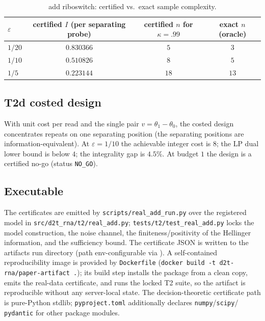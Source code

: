 \documentclass[11pt]{article}
\begin{document}
\begin{table}[ht]
\centering
\caption{add riboswitch: certified vs.\ exact sample complexity.}
\label{tab:supp-real}
\begin{tabular}{@{}lccc@{}}
\toprule
$\varepsilon$ & certified $I$ (per separating probe) & certified $n$ for $\kappa=.99$ & exact $n$ (oracle) \\
\midrule
$1/20$ & $0.830366$ & $5$ & $3$ \\
$1/10$ & $0.510826$ & $8$ & $5$ \\
$1/5$  & $0.223144$ & $18$ & $13$ \\
\bottomrule
\end{tabular}
\end{table}

\subsection{T2d costed design}
With unit cost per read and the single pair $v=\theta_1-\theta_0$, the costed design concentrates
repeats on one separating position (the separating positions are information-equivalent). At
$\varepsilon=1/10$ the achievable integer cost is $8$; the LP dual lower bound is below $4$; the
integrality gap is $4.5\%$. At budget $1$ the design is a certified no-go (status \texttt{NO\_GO}).

\subsection{Executable}
The certificates are emitted by \texttt{scripts/real\_add\_run.py} over the registered model in
\texttt{src/d2t\_rna/t2/real\_add.py}; \texttt{tests/t2/test\_real\_add.py} locks the model
construction, the noise channel, the finiteness/positivity of the Hellinger information, and the
sufficiency bound. The certificate JSON is written to the artifacts run directory (path
env-configurable via \texttt{}). A self-contained reproducibility image is
provided by \texttt{Dockerfile} (\texttt{docker build -t d2t-rna/paper-artifact .}); its build step
installs the package from a clean copy, emits the real-data certificate, and runs the locked T2 suite,
so the artifact is reproducible without any server-local state. The decision-theoretic certificate
path is pure-Python stdlib; \texttt{pyproject.toml} additionally declares \texttt{numpy}/\texttt{scipy}/
\texttt{pydantic} for other package modules.
\end{document}
